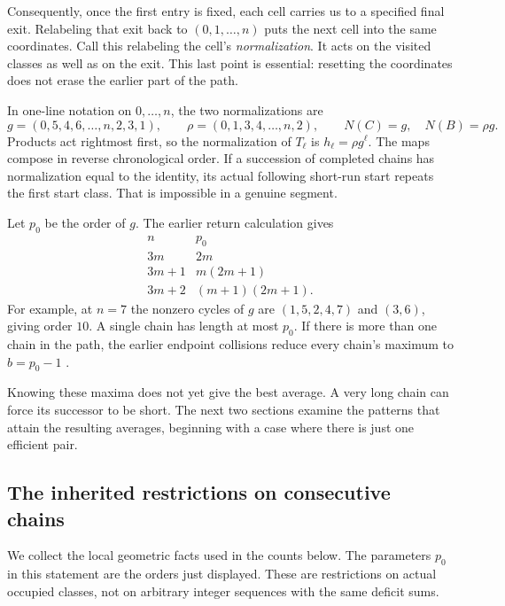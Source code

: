 Consequently, once the first entry is fixed, each cell carries us to a
specified final exit. Relabeling that exit back to $(0,1,\ldots,n)$
puts the next cell into the same coordinates. Call this relabeling
the cell's \emph{normalization}. It acts on the visited classes as well
as on the exit. This last point is essential: resetting the coordinates
does not erase the earlier part of the path.

In one-line notation on $0,\ldots,n$, the two normalizations are
\begin{equation}\label{eq:maps}
 g=(0,5,4,6,\ldots,n,2,3,1),\qquad
 \rho=(0,1,3,4,\ldots,n,2),\qquad
 N(C)=g,\quad N(B)=\rho g.
\end{equation}
Products act rightmost first, so the normalization of $T_\ell$ is
$h_\ell=\rho g^\ell$. The maps compose in reverse chronological
order. If a succession of completed chains has normalization equal to
the identity, its actual following short-run start repeats the first
start class. That is impossible in a genuine segment.

Let $p_0$ be the order of $g$. The earlier return calculation gives
\[
\begin{array}{c|c}
n&p_0\\\hline
3m&2m\\
3m+1&m(2m+1)\\
3m+2&(m+1)(2m+1).
\end{array}
\]
For example, at $n=7$ the nonzero cycles of $g$ are $(1,5,2,4,7)$
and $(3,6)$, giving order $10$. A single chain has length at most
$p_0$. If there is more than one chain in the path, the earlier
endpoint collisions reduce every chain's maximum to $b=p_0-1$
\cite{pantone-framework}.

Knowing these maxima does not yet give the best average. A very long
chain can force its successor to be short. The next two sections examine
the patterns that attain the resulting averages, beginning with a case
where there is just one efficient pair.

\subsection{The inherited restrictions on consecutive chains}

We collect the local geometric facts used in the counts below. The
parameters $p_0$ in this statement are the orders just displayed. These
are restrictions on actual occupied classes, not on arbitrary integer
sequences with the same deficit sums.

